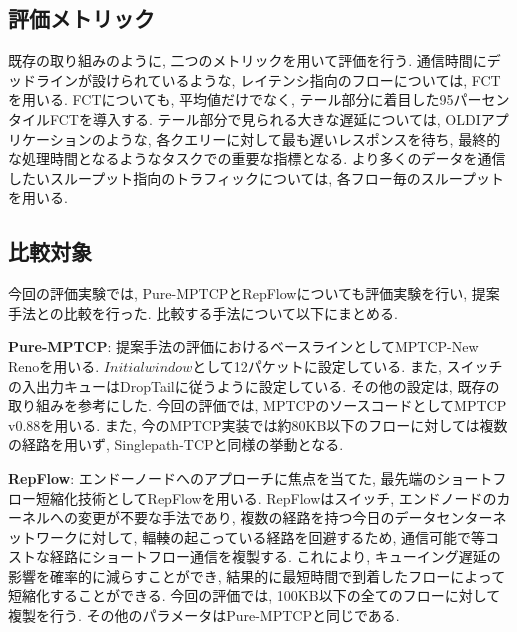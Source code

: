 
\subsection{評価メトリック}
既存の取り組み\cite{dctcp, d3, pdq}のように, 二つのメトリックを用いて評価を行う. 
通信時間にデッドラインが設けられているような, レイテンシ指向のフローについては, FCTを用いる. 
FCTについても, 平均値だけでなく, テール部分に着目した95パーセンタイルFCTを導入する. 
テール部分で見られる大きな遅延については, OLDIアプリケーションのような, 各クエリーに対して最も遅いレスポンスを待ち,
最終的な処理時間となるようなタスクでの重要な指標となる\cite{survey}. 
より多くのデータを通信したいスループット指向のトラフィックについては, 各フロー毎のスループットを用いる. 


\subsection{比較対象}
今回の評価実験では, Pure-MPTCP\cite{mptcp}とRepFlow\cite{repflow}についても評価実験を行い,
提案手法との比較を行った.
比較する手法について以下にまとめる.

{\bf Pure-MPTCP}\cite{mptcp}: 提案手法の評価におけるベースラインとしてMPTCP-New Renoを用いる. 
$Initial window$として12パケットに設定している. 
また, スイッチの入出力キューはDropTailに従うように設定している. 
その他の設定は, 既存の取り組みを参考にした\cite{d2tcp, p_fab}.
今回の評価では, MPTCPのソースコードとしてMPTCP v0.88を用いる. 
また, 今のMPTCP実装では約80KB以下のフローに対しては複数の経路を用いず, Singlepath-TCPと同様の挙動となる. 

{\bf RepFlow}\cite{repflow}: エンドーノードへのアプローチに焦点を当てた,
最先端のショートフロー短縮化技術としてRepFlowを用いる. 
RepFlowはスイッチ, エンドノードのカーネルへの変更が不要な手法であり, 複数の経路を持つ今日のデータセンターネットワークに対して,
輻輳の起こっている経路を回避するため, 通信可能で等コストな経路にショートフロー通信を複製する. 
これにより, キューイング遅延の影響を確率的に減らすことができ, 結果的に最短時間で到着したフローによって短縮化することができる.
今回の評価では, 100KB以下の全てのフローに対して複製を行う\cite{repflow}. 
その他のパラメータはPure-MPTCPと同じである. 

